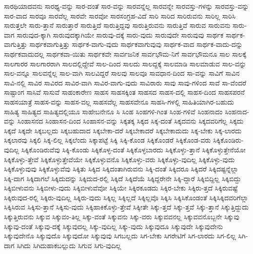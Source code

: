 {ಸಾರಥಿಯಾದವನು
ಸಾರಥ್ಯ-ವನ್ನು
ಸಾರ-ದಂತೆ
ಸಾರ-ವನ್ನು
ಸಾರವನ್ನೆಲ್ಲ
ಸಾರವನ್ನೇ
ಸಾರವಸ್ತು-ಗಳನ್ನು
ಸಾರವಸ್ತು-ವನ್ನು
ಸಾರ-ವಾದ
ಸಾರವೂ
ಸಾರವೆಲ್ಲ
ಸಾರವೇ
ಸಾರವೋ
ಸಾರಸಂಗ್ರಹ-ವಿದೆ
ಸಾರಿ
ಸಾರಿದ
ಸಾರಿರುವನು
ಸಾರಿಲ್ಲ
ಸಾರಿಸಿ
ಸಾರುತ್ತಲೇ
ಸಾರು-ತ್ತಾನೆ
ಸಾರುತ್ತಾರೆ
ಸಾರುತ್ತಿದೆ
ಸಾರುತ್ತಿದ್ದವು
ಸಾರುತ್ತಿರುವನು
ಸಾರುತ್ತಿವೆ
ಸಾರುವ
ಸಾರುವನು
ಸಾರು-ವಾಗ
ಸಾರುವುದ-ಕ್ಕಾಗಿ
ಸಾರುವುದಕ್ಕಾಗಿಯೇ
ಸಾರುವು-ದಕ್ಕೆ
ಸಾರು-ವುದು
ಸಾರುವುದೇ
ಸಾರುವುವು
ಸಾರ್ಥಕ
ಸಾರ್ಥಕ-ವಾಗುತ್ತಿತ್ತು
ಸಾರ್ಥಕವಾಗುತ್ತಿತ್ತು
ಸಾರ್ಥಕ-ವಾಗು-ವುದು
ಸಾರ್ಥಕವಾಗುವುವು
ಸಾರ್ಥಕ-ವಾದ
ಸಾರ್ಥಕ-ವಾದು-ದನ್ನು
ಸಾರ್ಥಕವಾದುದಲ್ಲ
ಸಾರ್ಥಕವಾ-ಯಿತು
ಸಾರ್ಥಕವೇ
ಸಾರ್ವಜನಿಕ
ಸಾರ್ವಭೌಮ-ನಿಗೆ
ಸಾರ್ವಭೌಮನೂ
ಸಾಲ
ಸಾಲಕ್ಕೆ
ಸಾಲಗಾರರ
ಸಾಲಗಾರರಾಗಿ
ಸಾಲದಲ್ಲಿದ್ದೇವೆ
ಸಾಲ-ದಿಂದ
ಸಾಲದು
ಸಾಲದ್ದಕ್ಕೆ
ಸಾಲಮಾಡಿ
ಸಾಲಮಾಡುವ
ಸಾಲ-ವನ್ನು
ಸಾಲ-ವನ್ನೂ
ಸಾಲವನ್ನೆಲ್ಲ
ಸಾಲ-ವಾಗಿ
ಸಾಲವಿದ್ದರೆ
ಸಾಲವು
ಸಾಲವೂ
ಸಾವಧಾನ-ದಿಂದ
ಸಾ-ವನ್ನು
ಸಾವಿಗೆ
ಸಾವಿನ
ಸಾವಿ-ನಲ್ಲಿ
ಸಾವಿರ
ಸಾವಿರದ
ಸಾವಿರ-ವಾಗಿ
ಸಾವಿರ-ವಾಗು-ವುದು
ಸಾವಿರಾರು
ಸಾವು
ಸಾವು-ಗಳಿಂದ
ಸಾವೆ
ಸಾ-ವೆಂದರೆ
ಸಾಷ್ಟಾಂಗ
ಸಾಸಿವೆ
ಸಾಸುವೆ
ಸಾಹಂಕಾರೇಣ
ಸಾಹಸ
ಸಾಹಸಕ್ಕಿಂತ
ಸಾಹಸದ
ಸಾಹಸ-ದಲ್ಲಿ
ಸಾಹಸ-ದಿಂದ
ಸಾಹಸಪರನೆ
ಸಾಹಸಯಾತ್ರೆ
ಸಾಹಸ-ವನ್ನು
ಸಾಹಸ-ವಲ್ಲ
ಸಾಹಸವೆಲ್ಲ
ಸಾಹಸವೇನೂ
ಸಾಹಸಿ-ಗಳಲ್ಲಿ
ಸಾಹಿತಿಯಾಗಿರ-ಬಹುದು
ಸಾಹಿತ್ಯ
ಸಾಹಿತ್ಯದ
ಸಾಹಿತ್ಯದಲ್ಲಿಯೂ
ಸಾಹೇಬನೇನೂ
ಸಿ
ಸಿಂಹ
ಸಿಂಹಗಳಿ-ಗಿಂತ
ಸಿಂಹ-ಗಳಿವೆ
ಸಿಂಹನಾದಂ
ಸಿಂಹನಾದ-ವನ್ನು
ಸಿಂಹಾಸನದ
ಸಿಂಹಾಸನ-ದಿಂದ
ಸಿಂಹಾಸನ-ವನ್ನು
ಸಿಕ್ಕತಕ್ಕ
ಸಿಕ್ಕದ
ಸಿಕ್ಕ-ದಂತೆ
ಸಿಕ್ಕದವನು
ಸಿಕ್ಕದವರಿಗೆಲ್ಲ
ಸಿಕ್ಕದು
ಸಿಕ್ಕದೆ
ಸಿಕ್ಕದೇ
ಸಿಕ್ಕಬಲ್ಲದು
ಸಿಕ್ಕಬಹುದಾದ
ಸಿಕ್ಕಬೇಕಾ-ದರೆ
ಸಿಕ್ಕಬೇಕಾದರೆ
ಸಿಕ್ಕಬೇಕಾದುದು
ಸಿಕ್ಕ-ಬೇಕು
ಸಿಕ್ಕ-ಲಾರದು
ಸಿಕ್ಕಲಾರವು
ಸಿಕ್ಕಲಿ
ಸಿಕ್ಕ-ಲಿಲ್ಲ
ಸಿಕ್ಕಲೆಂದು
ಸಿಕ್ಕಾಪಟ್ಟೆ
ಸಿಕ್ಕಿ
ಸಿಕ್ಕಿ-ಕೊಂಡ
ಸಿಕ್ಕಿಕೊಂಡರೆ
ಸಿಕ್ಕಿಕೊಂಡ-ವರು
ಸಿಕ್ಕಿಕೊಂಡಿರು-ವುದಿಲ್ಲ
ಸಿಕ್ಕಿಕೊಂಡಿರುವೆವು
ಸಿಕ್ಕಿ-ಕೊಂಡು
ಸಿಕ್ಕಿಕೊಳ್ಳ-ದಂತೆ
ಸಿಕ್ಕಿಕೊಳ್ಳಬಾರದು
ಸಿಕ್ಕಿಕೊಳ್ಳು-ತ್ತಾನೆ
ಸಿಕ್ಕಿಕೊಳ್ಳುತ್ತೇನೆಯೋ
ಸಿಕ್ಕಿಕೊಳ್ಳು-ತ್ತೇವೆ
ಸಿಕ್ಕಿಕೊಳ್ಳುತ್ತೇವೆಯೇ
ಸಿಕ್ಕಿಕೊಳ್ಳುವನೊ
ಸಿಕ್ಕಿಕೊಳ್ಳು-ವರು
ಸಿಕ್ಕಿಕೊಳ್ಳು-ವುದಿಲ್ಲ
ಸಿಕ್ಕಿಕೊಳ್ಳು-ವುದು
ಸಿಕ್ಕಿಕೊಳ್ಳುವುವು
ಸಿಕ್ಕಿಕೊಳ್ಳುವೆವು
ಸಿಕ್ಕಿತು
ಸಿಕ್ಕಿದ
ಸಿಕ್ಕಿದಂತಾಗಿರುವನು
ಸಿಕ್ಕಿ-ದಂತೆ
ಸಿಕ್ಕಿದರೂ
ಸಿಕ್ಕಿದರೆ
ಸಿಕ್ಕಿದಷ್ಟನ್ನೆಲ್ಲಾ
ಸಿಕ್ಕಿ-ದಾಗ
ಸಿಕ್ಕಿದಾಗಲೆ
ಸಿಕ್ಕಿದುದನ್ನು
ಸಿಕ್ಕಿದುದ-ರಲ್ಲಿ
ಸಿಕ್ಕಿದೆ
ಸಿಕ್ಕಿದೆಯೆ
ಸಿಕ್ಕಿದ್ದರೇನೇ
ಸಿಕ್ಕಿ-ದ್ದಾರೆ
ಸಿಕ್ಕಿಬಿದ್ದಿಲ್ಲ
ಸಿಕ್ಕಿಬಿದ್ದು
ಸಿಕ್ಕಿಬೀಳುವನು
ಸಿಕ್ಕಿಬೀಳು-ವುದು
ಸಿಕ್ಕಿಬೀಳುವೆವೋ
ಸಿಕ್ಕಿಯೇ
ಸಿಕ್ಕಿರಕೂಡದು
ಸಿಕ್ಕಿರ-ಬೇಕು
ಸಿಕ್ಕಿರು-ತ್ತದೆ
ಸಿಕ್ಕಿರುವಷ್ಟೆ
ಸಿಕ್ಕಿರುವುದ-ರಲ್ಲಿ
ಸಿಕ್ಕಿರು-ವುದಿಲ್ಲ
ಸಿಕ್ಕಿರು-ವುದು
ಸಿಕ್ಕಿಲ್ಲ
ಸಿಕ್ಕಿಲ್ಲದೆ
ಸಿಕ್ಕಿಲ್ಲವೊ
ಸಿಕ್ಕಿಸಿ
ಸಿಕ್ಕಿಸಿಕೊಂಡಂತೆ
ಸಿಕ್ಕಿಸಿಕ್ಕಿದವರಿಗೆಲ್ಲಾ
ಸಿಕ್ಕಿಸಿರುವ
ಸಿಕ್ಕಿಸು-ತ್ತಾನೆ
ಸಿಕ್ಕಿಸು-ವುದು
ಸಿಕ್ಕಿಹಾಕಿಕೊಳ್ಳು-ತ್ತೇವೆ
ಸಿಕ್ಕೀತೇ
ಸಿಕ್ಕು-ತ್ತದೆ
ಸಿಕ್ಕು-ತ್ತವೆ
ಸಿಕ್ಕು-ತ್ತಾನೆ
ಸಿಕ್ಕುತ್ತಿದ್ದುದು
ಸಿಕ್ಕುತ್ತಿರುವನು
ಸಿಕ್ಕುವ
ಸಿಕ್ಕುವಂ-ತಿಲ್ಲ
ಸಿಕ್ಕು-ವಂತೆ
ಸಿಕ್ಕುವನು
ಸಿಕ್ಕು-ವರು
ಸಿಕ್ಕುವವನಲ್ಲ
ಸಿಕ್ಕುವವನೊಬ್ಬನೇ
ಸಿಕ್ಕುವು
ಸಿಕ್ಕುವು-ದಂತೆ
ಸಿಕ್ಕುವು-ದಕ್ಕೆ
ಸಿಕ್ಕುವುದಲ್ಲ
ಸಿಕ್ಕು-ವುದಿಲ್ಲ
ಸಿಕ್ಕು-ವುದು
ಸಿಕ್ಕುವುದೂ
ಸಿಕ್ಕುವುದೇ
ಸಿಕ್ಕುವುದೇನು
ಸಿಕ್ಕುವುದೇನೊ
ಸಿಕ್ಕುವುದೊ
ಸಿಕ್ಕುವುದೋ
ಸಿಕ್ಕುವುವು
ಸಿಗಬಲ್ಲದು
ಸಿಗ-ಬೇಕು
ಸಿಗರೇಟಿಗೆ
ಸಿಗ-ಲಾರದು
ಸಿಗ-ಲಿಲ್ಲ
ಸಿಗಿ-ದಾಗ
ಸಿಗಿದು
ಸಿಗಿದುಹಾಕಬಲ್ಲುದು
ಸಿಗುವ
ಸಿಗು-ವುದಿಲ್ಲ
}
